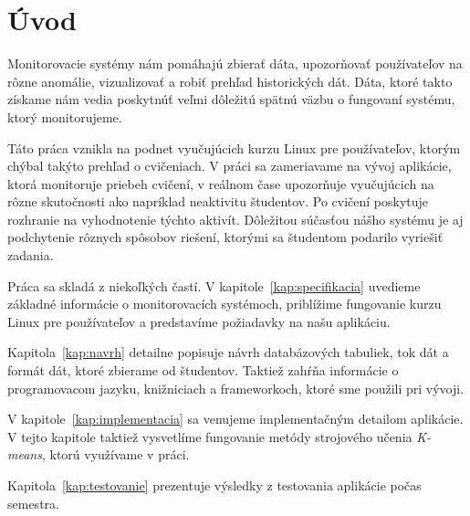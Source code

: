 \chapter*{Úvod} %

Monitorovacie systémy nám pomáhajú zbierať dáta, upozorňovať používateľov na rôzne
anomálie, vizualizovať a robiť prehľad historických dát. Dáta, ktoré takto získame nám
vedia poskytnúť veľmi dôležitú spätnú väzbu o fungovaní systému, ktorý monitorujeme.

Táto práca vznikla na podnet vyučujúcich kurzu Linux pre používateľov, ktorým chýbal
takýto prehľad o cvičeniach. V práci sa zameriavame na vývoj aplikácie, ktorá
monitoruje priebeh cvičení, v reálnom čase upozorňuje vyučujúcich na rôzne skutočnosti
ako napríklad neaktivitu študentov.
Po cvičení poskytuje rozhranie na vyhodnotenie týchto aktivít. Dôležitou súčasťou
nášho systému je aj podchytenie rôznych spôsobov riešení, ktorými  sa študentom
podarilo vyriešiť zadania.

Práca sa skladá z niekoľkých častí. V kapitole~\ref{kap:specifikacia} uvedieme základné
informácie o monitorovacích systémoch, priblížime fungovanie kurzu Linux pre používateľov
a predstavíme požiadavky na našu aplikáciu.

Kapitola~\ref{kap:navrh} detailne popisuje návrh databázových tabuliek, tok dát a
formát dát, ktoré zbierame od študentov. Taktiež zahŕňa informácie o programovacom jazyku,
knižniciach a frameworkoch, ktoré sme použili pri vývoji.

V kapitole~\ref{kap:implementacia} sa venujeme implementačným detailom aplikácie. V tejto
kapitole taktiež vysvetlíme fungovanie metódy strojového učenia \textit{K-means}, ktorú
využívame v práci.

Kapitola~\ref{kap:testovanie} prezentuje výsledky z testovania aplikácie počas semestra.
